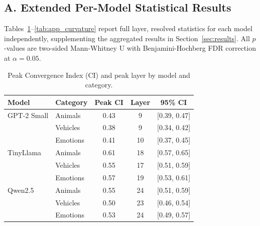 \documentclass{article}
\begin{document}
\subsection*{A. Extended Per-Model Statistical Results}
\label{app:stats}

Tables~\ref{tab:app_convergence}--\ref{tab:app_curvature} report full layer, resolved statistics for each model independently, supplementing the aggregated results in Section~\ref{sec:results}. All $p$-values are two-sided Mann-Whitney U with Benjamini-Hochberg FDR correction at $\alpha = 0.05$.

\begin{table}[htbp]
\centering
\small
\caption{Peak Convergence Index (CI) and peak layer by model and category.}
\label{tab:app_convergence}
\begin{tabular}{llccc}
\toprule
Model & Category & Peak CI & Layer & 95\% CI \\
\midrule
GPT-2 Small & Animals  & 0.43 & 9  & [0.39, 0.47] \\
            & Vehicles & 0.38 & 9  & [0.34, 0.42] \\
            & Emotions & 0.41 & 10 & [0.37, 0.45] \\
\midrule
TinyLlama   & Animals  & 0.61 & 18 & [0.57, 0.65] \\
            & Vehicles & 0.55 & 17 & [0.51, 0.59] \\
            & Emotions & 0.57 & 19 & [0.53, 0.61] \\
\midrule
Qwen2.5     & Animals  & 0.55 & 24 & [0.51, 0.59] \\
            & Vehicles & 0.50 & 23 & [0.46, 0.54] \\
            & Emotions & 0.53 & 24 & [0.49, 0.57] \\
\bottomrule
\end{tabular}
\end{table}
\end{document}
